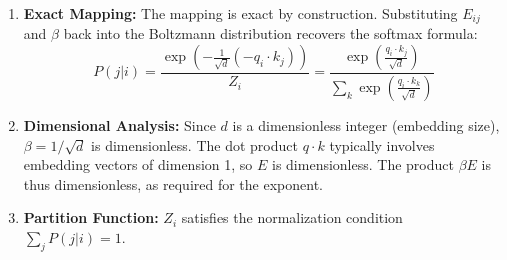 \begin{enumerate}
    \item \textbf{Exact Mapping:} The mapping is exact by construction. Substituting $E_{ij}$ and $\beta$ back into the Boltzmann distribution recovers the softmax formula:
    \begin{equation}
        P(j|i) = \frac{\exp \left( -\frac{1}{\sqrt{d}} (-q_i \cdot k_j) \right)}{Z_i} = \frac{\exp \left( \frac{q_i \cdot k_j}{\sqrt{d}} \right)}{\sum_{k} \exp \left( \frac{q_i \cdot k_k}{\sqrt{d}} \right)}
    \end{equation}
    \item \textbf{Dimensional Analysis:} Since $d$ is a dimensionless integer (embedding size), $\beta = 1/\sqrt{d}$ is dimensionless. The dot product $q \cdot k$ typically involves embedding vectors of dimension 1, so $E$ is dimensionless. The product $\beta E$ is thus dimensionless, as required for the exponent.
    \item \textbf{Partition Function:} $Z_i$ satisfies the normalization condition $\sum_j P(j|i) = 1$.
\end{enumerate}
